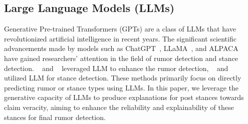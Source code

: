 \subsection{Large Language Models (LLMs)}
Generative Pre-trained Transformers (GPTs) are a class of LLMs that have revolutionized artificial intelligence in recent years. 
The significant scientific advancements made by models such as ChatGPT~\cite{NEURIPS2020_1457c0d6}, LLaMA~\cite{touvron2023Llama}, and ALPACA~\cite{taori2023alpaca} have gained researchers' attention in the field of rumor detection and stance detection. ~\citet{yan2024enhancing} and ~\citet{yang-etal-2024-reinforcement} leveraged LLM to enhance the rumor detection, 
~\citet{lan2024stance} and ~\citet{gambini2024evaluating} utilized LLM for stance detection.
These methods primarily focus on directly predicting rumor or stance types using LLMs. %
In this paper, %
we leverage the generative capacity of LLMs to produce explanations for post stances towards claim veracity, aiming to enhance the reliability and explainability of these stances for final rumor detection. %


